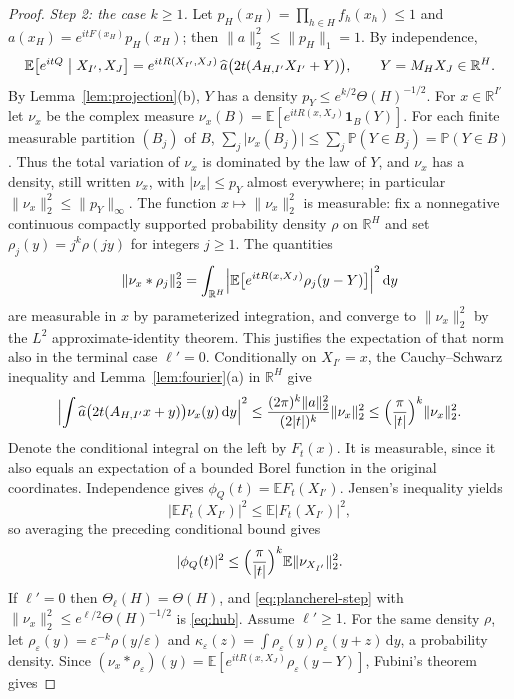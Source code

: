 \documentclass[11pt]{amsart}
\numberwithin{equation}{section}
\theoremstyle{definition}
\theoremstyle{remark}
\newcommand{\R}{\mathbb R}
\newcommand{\E}{\mathbb E}
\newcommand{\PP}{\mathbb P}
\newcommand{\1}{\mathbf 1}
\newcommand{\dd}{\,\mathrm d}
\newcommand{\norm}[1]{\lVert #1\rVert}
\newcommand{\abs}[1]{\lvert #1\rvert}
\begin{document}
\begin{proof}
\emph{Step 2: the case $k\ge1$.} Let $p_H(x_H)=\prod_{h\in H}f_h(x_h)\le1$ and $a(x_H)=e^{itF(x_H)}p_H(x_H)$; then $\norm a_2^2\le\norm{p_H}_1=1$. By independence,
\[
\E\bigl[e^{itQ}\bigm|X_{I'},X_J\bigr]=e^{itR(X_{I'},X_J)}\,\widehat a\bigl(2t(A_{H,I'}X_{I'}+Y)\bigr),\qquad Y=M_HX_J\in\R^H.
\]
By Lemma~\ref{lem:projection}(b), $Y$ has a density $p_Y\le e^{k/2}\Theta(H)^{-1/2}$. For $x\in\R^{I'}$ let $\nu_x$ be the complex measure $\nu_x(B)=\E[e^{itR(x,X_J)}\1_B(Y)]$. For each finite measurable partition $(B_j)$ of $B$, $\sum_j\abs{\nu_x(B_j)}\le\sum_j\PP(Y\in B_j)=\PP(Y\in B)$. Thus the total variation of $\nu_x$ is dominated by the law of $Y$, and $\nu_x$ has a density, still written $\nu_x$, with $\abs{\nu_x}\le p_Y$ almost everywhere; in particular $\norm{\nu_x}_2^2\le\norm{p_Y}_\infty$. The function $x\mapsto\norm{\nu_x}_2^2$ is measurable: fix a nonnegative continuous compactly supported probability density $\rho$ on $\R^H$ and set $\rho_j(y)=j^k\rho(jy)$ for integers $j\ge1$. The quantities
\[
\norm{\nu_x*\rho_j}_2^2=\int_{\R^H}\Bigl\lvert\E\bigl[e^{itR(x,X_J)}\rho_j(y-Y)\bigr]\Bigr\rvert^2\dd y
\]
are measurable in $x$ by parameterized integration, and converge to $\norm{\nu_x}_2^2$ by the $L^2$ approximate-identity theorem. This justifies the expectation of that norm also in the terminal case $\ell'=0$. Conditionally on $X_{I'}=x$, the Cauchy--Schwarz inequality and Lemma~\ref{lem:fourier}(a) in $\R^H$ give
\[
\Bigl\lvert\int\widehat a\bigl(2t(A_{H,I'}x+y)\bigr)\nu_x(y)\dd y\Bigr\rvert^2\le\frac{(2\pi)^k\norm a_2^2}{(2\abs t)^k}\norm{\nu_x}_2^2\le\Bigl(\frac\pi{\abs t}\Bigr)^k\norm{\nu_x}_2^2 .
\]
Denote the conditional integral on the left by $F_t(x)$. It is measurable, since it also equals an expectation of a bounded Borel function in the original coordinates. Independence gives $\phi_Q(t)=\E F_t(X_{I'})$. Jensen's inequality yields
\[
\abs{\E F_t(X_{I'})}^2\le\E\abs{F_t(X_{I'})}^2,
\]
so averaging the preceding conditional bound gives
\begin{equation}\label{eq:plancherel-step}
\abs{\phi_Q(t)}^2\le\Bigl(\frac\pi{\abs t}\Bigr)^k\E\norm{\nu_{X_{I'}}}_2^2 .
\end{equation}
If $\ell'=0$ then $\Theta_\ell(H)=\Theta(H)$, and \eqref{eq:plancherel-step} with $\norm{\nu_x}_2^2\le e^{\ell/2}\Theta(H)^{-1/2}$ is \eqref{eq:hub}. Assume $\ell'\ge1$. For the same density $\rho$, let $\rho_\varepsilon(y)=\varepsilon^{-k}\rho(y/\varepsilon)$ and $\kappa_\varepsilon(z)=\int\rho_\varepsilon(y)\rho_\varepsilon(y+z)\dd y$, a probability density. Since $(\nu_x*\rho_\varepsilon)(y)=\E[e^{itR(x,X_J)}\rho_\varepsilon(y-Y)]$, Fubini's theorem gives

\end{proof}
\end{document}
